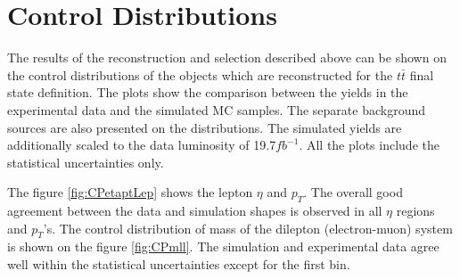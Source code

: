\section{Control Distributions}

The results of the reconstruction and selection described above can be shown on the control distributions of the objects which are reconstructed for the $t\bar{t}$
final state definition. The plots show the comparison between the yields in the experimental data and the simulated MC samples.
The separate background sources are also presented on the distributions. The simulated yields are additionally scaled to the data luminosity of 19.7\;$fb^{-1}$.
All the plots include the statistical uncertainties only.

The figure \ref{fig:CPetaptLep} shows the lepton $\eta$ and $p_{T}$. The overall good agreement between the data and simulation shapes is observed in all $\eta$ regions
and $p_{T}$'s. The control distribution of mass of the dilepton (electron-muon) system is shown on the figure \ref{fig:CPmll}. The simulation and experimental data
agree well within the statistical uncertainties except for the first bin.

